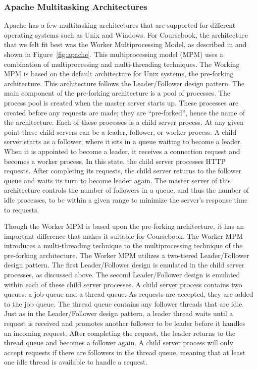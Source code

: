 \subsubsection{Apache Multitasking Architectures}
Apache has a few multitasking architectures that are supported for different 
operating systems such as Unix and Windows. For Coursebook, the architecture 
that we felt fit best was the Worker Multiprocessing Model, as described in 
\cite{Apache} and shown in Figure~\ref{fig:apache}. This multiprocessing model 
(MPM) uses a combination of multiprocessing and multi-threading techniques. The 
Working MPM is based on the default architecture for Unix systems, the 
pre-forking architecture. This architecture follows the Leader/Follower design
pattern. The main component of the pre-forking architecture is a pool of 
processes. The process pool is created when the master server starts up. These
processes are created before any requests are made; they are ``pre-forked'', 
hence the name of the architecture. Each of these processes is a child server
process. At any given point these child servers can be a leader, follower, or
worker process. A child server starts as a follower, where it sits in a queue
waiting to become a leader. When it is appointed to become a leader, it receives
a connection request and becomes a worker process. In this state, the child
server processes HTTP requests. After completing its requests, the child server
returns to the follower queue and waits its turn to become leader again. The
master server of this architecture controls the number of followers in a queue,
and thus the number of idle processes, to be within a given range to minimize
the server's response time to requests. 

Though the Worker MPM is based upon the pre-forking architecture, it has an
important difference that makes it suitable for Coursebook. The Worker MPM
introduces a multi-threading technique to the multiprocessing technique of the
pre-forking architecture. The Worker MPM utilizes a two-tiered Leader/Follower
design pattern. The first Leader/Follower design is emulated in the child server
processes, as discussed above. The second Leader/Follower design is emulated
within each of these child server processes. A child server process contains two
queues: a job queue and a thread queue. As requests are accepted, they are added
to the job queue. The thread queue contains any follower threads that are idle.
Just as in the Leader/Follower design pattern, a leader thread waits until a
request is received and promotes another follower to be leader before it handles
an incoming request. After completing the request, the leader returns to the
thread queue and becomes a follower again. A child server process will only
accept requests if there are followers in the thread queue, meaning that at
least one idle thread is available to handle a request. 

